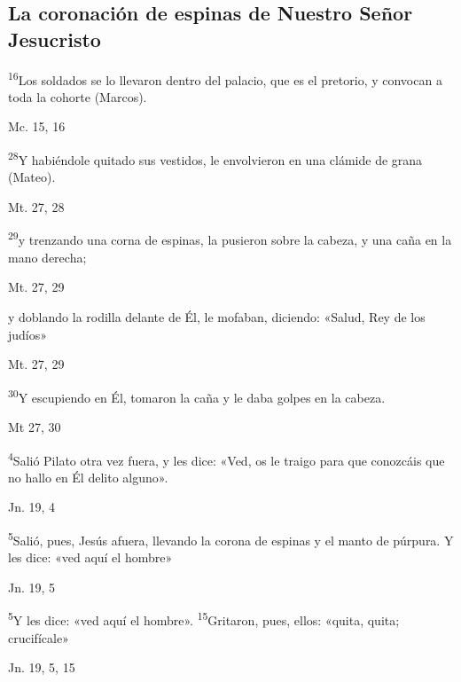 \documentclass[a4paper,11pt]{article}
\begin{document}
    \subsection*{\hfil La coronación de espinas de Nuestro Señor Jesucristo \hfil}
      
      \textsuperscript{16}Los soldados se lo llevaron dentro del palacio, que es el pretorio, y convocan a toda la cohorte (Marcos).
      \begin{flushright}
        Mc. 15, 16
      \end{flushright}
      \textsuperscript{28}Y habiéndole quitado sus vestidos, le envolvieron en una clámide de grana (Mateo).
      \begin{flushright}
        Mt. 27, 28
      \end{flushright}

      \textsuperscript{29}y trenzando una corna de espinas, la pusieron sobre la cabeza, y una caña en la mano derecha; 
      \begin{flushright}
        Mt. 27, 29
      \end{flushright}

      y doblando la rodilla delante de Él, le mofaban, diciendo: «Salud, Rey de los judíos»
      \begin{flushright}
        Mt. 27, 29
      \end{flushright}

      \textsuperscript{30}Y escupiendo en Él, tomaron la caña y le daba golpes en la cabeza.
      \begin{flushright}
        Mt 27, 30
      \end{flushright}

      \textsuperscript{4}Salió Pilato otra vez fuera, y les dice: «Ved, os le traigo para que conozcáis que no hallo en Él delito alguno».
      \begin{flushright}
        Jn. 19, 4
      \end{flushright}

      \textsuperscript{5}Salió, pues, Jesús afuera, llevando la corona de espinas y el manto de púrpura. Y les dice: «ved aquí el hombre»
      \begin{flushright}
        Jn. 19, 5
      \end{flushright}

      \textsuperscript{5}Y les dice: «ved aquí el hombre». \textsuperscript{15}Gritaron, pues, ellos: «quita, quita; crucifícale»
      \begin{flushright}
        Jn. 19, 5, 15
      \end{flushright}
\end{document}
